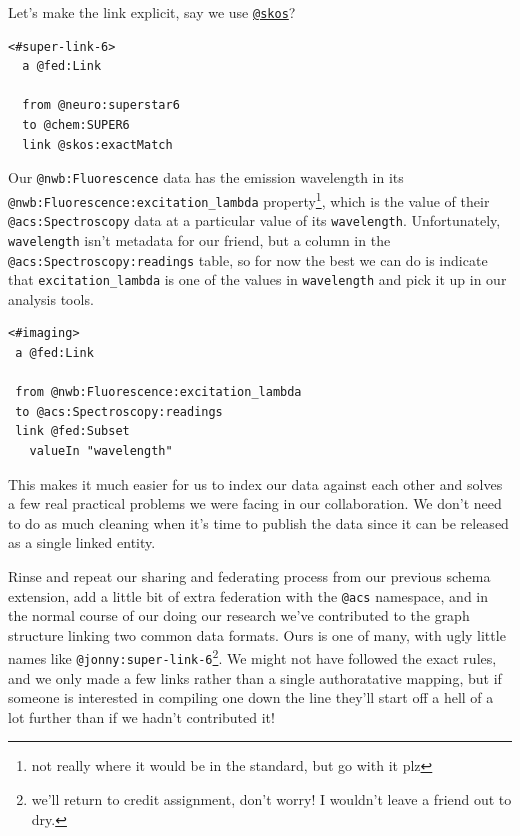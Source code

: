 \documentclass[10pt]{article}
\begin{document}
\begin{multicols}{2}
Let's make the link explicit, say we use
\href{https://www.w3.org/2009/08/skos-reference/skos.html}{\texttt{@skos}}?

\begin{verbatim}
<#super-link-6>
  a @fed:Link
  
  from @neuro:superstar6
  to @chem:SUPER6
  link @skos:exactMatch
\end{verbatim}

Our \texttt{@nwb:Fluorescence} data has the emission wavelength in its
\texttt{@nwb:Fluorescence:excitation\_lambda} property\footnote{not
  really where it would be in the standard, but go with it plz}, which
is the value of their \texttt{@acs:Spectroscopy} data at a particular
value of its \texttt{wavelength}. Unfortunately, \texttt{wavelength}
isn't metadata for our friend, but a column in the
\texttt{@acs:Spectroscopy:readings} table, so for now the best we can do
is indicate that \texttt{excitation\_lambda} is one of the values in
\texttt{wavelength} and pick it up in our analysis tools.

\begin{verbatim}
<#imaging>
 a @fed:Link
 
 from @nwb:Fluorescence:excitation_lambda
 to @acs:Spectroscopy:readings
 link @fed:Subset
   valueIn "wavelength"
\end{verbatim}

This makes it much easier for us to index our data against each other
and solves a few real practical problems we were facing in our
collaboration. We don't need to do as much cleaning when it's time to
publish the data since it can be released as a single linked entity.

Rinse and repeat our sharing and federating process from our previous
schema extension, add a little bit of extra federation with the
\texttt{@acs} namespace, and in the normal course of our doing our
research we've contributed to the graph structure linking two common
data formats. Ours is one of many, with ugly little names like
\texttt{@jonny:super-link-6}\footnote{we'll return to credit assignment,
  don't worry! I wouldn't leave a friend out to dry.}. We might not have
followed the exact rules, and we only made a few links rather than a
single authoratative mapping, but if someone is interested in compiling
one down the line they'll start off a hell of a lot further than if we
hadn't contributed it!


\end{multicols}
\end{document}

